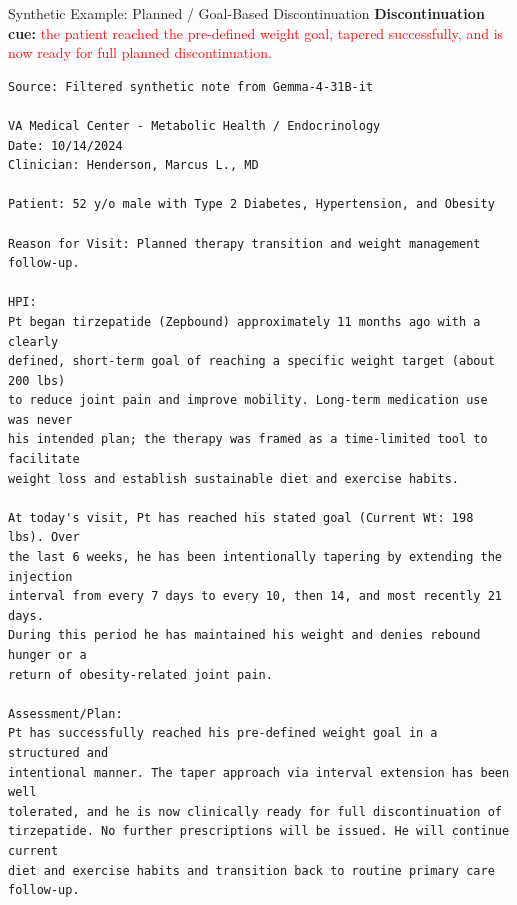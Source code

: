 \documentclass[aspectratio=169]{beamer}
\begin{document}
\begin{frame}{Synthetic Example: Planned / Goal-Based Discontinuation}
\tiny
\textbf{Discontinuation cue:}
\textcolor{red}{the patient reached the pre-defined weight goal, tapered successfully, and is now ready for full planned discontinuation.}

\vspace{0.5em}
\begin{verbatim}
Source: Filtered synthetic note from Gemma-4-31B-it

VA Medical Center - Metabolic Health / Endocrinology
Date: 10/14/2024
Clinician: Henderson, Marcus L., MD

Patient: 52 y/o male with Type 2 Diabetes, Hypertension, and Obesity

Reason for Visit: Planned therapy transition and weight management follow-up.

HPI:
Pt began tirzepatide (Zepbound) approximately 11 months ago with a clearly
defined, short-term goal of reaching a specific weight target (about 200 lbs)
to reduce joint pain and improve mobility. Long-term medication use was never
his intended plan; the therapy was framed as a time-limited tool to facilitate
weight loss and establish sustainable diet and exercise habits.

At today's visit, Pt has reached his stated goal (Current Wt: 198 lbs). Over
the last 6 weeks, he has been intentionally tapering by extending the injection
interval from every 7 days to every 10, then 14, and most recently 21 days.
During this period he has maintained his weight and denies rebound hunger or a
return of obesity-related joint pain.

Assessment/Plan:
Pt has successfully reached his pre-defined weight goal in a structured and
intentional manner. The taper approach via interval extension has been well
tolerated, and he is now clinically ready for full discontinuation of
tirzepatide. No further prescriptions will be issued. He will continue current
diet and exercise habits and transition back to routine primary care follow-up.
\end{verbatim}
\end{frame}
\end{document}
